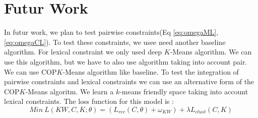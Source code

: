 \section{Futur Work}
In futur work, we plan to test pairwise constraints(Eq \ref{eq:omegaML}, 
\ref{eq:omegaCL}).
To test these  constraints, we usee need another baseline algorithm. For
lexical constraint we only used deep $K$-Means algorithm. We can use this
algorithm, but we have to also use algorithm taking into account pair. We can 
use COP$K$-Means algorithm like baseline. To test the integration of pairwise
constraints and lexical constraints we can use an alternative form of the 
COP$K$-Means algoritm. We learn a $k$-means friendly space taking into account 
lexical constraints. The loss function for this model is :
\begin{equation}
  Min~L(KW, C, K; \theta) = (L_{rec}(C, \theta) + \omega_{KW} )+
  \lambda L_{clust}(C,K)
\end{equation}